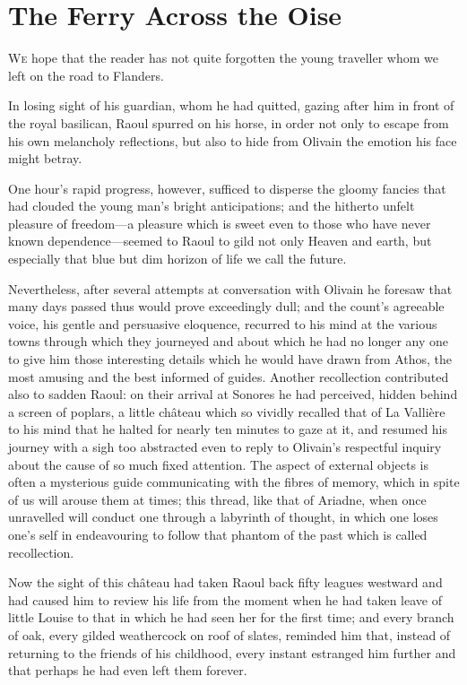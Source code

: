 \chapter{The Ferry Across the Oise}

 \lettrine{W}{e} hope that the reader has not quite forgotten the young traveller whom we left on the road to Flanders.

\zz
In losing sight of his guardian, whom he had quitted, gazing after him in front of the royal basilican, Raoul spurred on his horse, in order not only to escape from his own melancholy reflections, but also to hide from Olivain the emotion his face might betray.

One hour's rapid progress, however, sufficed to disperse the gloomy fancies that had clouded the young man's bright anticipations; and the hitherto unfelt pleasure of freedom—a pleasure which is sweet even to those who have never known dependence—seemed to Raoul to gild not only Heaven and earth, but especially that blue but dim horizon of life we call the future.

Nevertheless, after several attempts at conversation with Olivain he foresaw that many days passed thus would prove exceedingly dull; and the count's agreeable voice, his gentle and persuasive eloquence, recurred to his mind at the various towns through which they journeyed and about which he had no longer any one to give him those interesting details which he would have drawn from Athos, the most amusing and the best informed of guides. Another recollection contributed also to sadden Raoul: on their arrival at Sonores he had perceived, hidden behind a screen of poplars, a little château which so vividly recalled that of La Vallière to his mind that he halted for nearly ten minutes to gaze at it, and resumed his journey with a sigh too abstracted even to reply to Olivain's respectful inquiry about the cause of so much fixed attention. The aspect of external objects is often a mysterious guide communicating with the fibres of memory, which in spite of us will arouse them at times; this thread, like that of Ariadne, when once unravelled will conduct one through a labyrinth of thought, in which one loses one's self in endeavouring to follow that phantom of the past which is called recollection.

Now the sight of this château had taken Raoul back fifty leagues westward and had caused him to review his life from the moment when he had taken leave of little Louise to that in which he had seen her for the first time; and every branch of oak, every gilded weathercock on roof of slates, reminded him that, instead of returning to the friends of his childhood, every instant estranged him further and that perhaps he had even left them forever.

